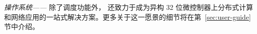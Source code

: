 
\textit{操作系统——} 除了调度功能外，\OSname{} 还致力于成为异构 32 位微控制器上分布式计算和网络应用的一站式解决方案。更多关于这一愿景的细节将在第~\ref{sec:user-guide} 节中介绍。

